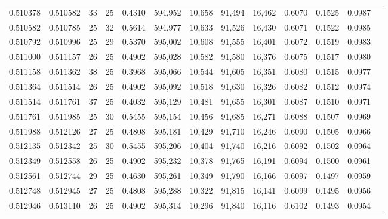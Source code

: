 \begin{tabular}{rrrrrrrrrrrrr}
0.510378 & 0.510582 &    33 &  25 &                                     0.4310 & 594,952 &  10,658 &  91,494 &  16,462 & 0.6070 & 0.1525 & 0.0987 \\
0.510582 & 0.510785 &    25 &  32 &                                     0.5614 & 594,977 &  10,633 &  91,526 &  16,430 & 0.6071 & 0.1522 & 0.0985 \\
0.510792 & 0.510996 &    25 &  29 &                                     0.5370 & 595,002 &  10,608 &  91,555 &  16,401 & 0.6072 & 0.1519 & 0.0983 \\
0.511000 & 0.511157 &    26 &  25 &                                     0.4902 & 595,028 &  10,582 &  91,580 &  16,376 & 0.6075 & 0.1517 & 0.0980 \\
0.511158 & 0.511362 &    38 &  25 &                                     0.3968 & 595,066 &  10,544 &  91,605 &  16,351 & 0.6080 & 0.1515 & 0.0977 \\
0.511364 & 0.511514 &    26 &  25 &                                     0.4902 & 595,092 &  10,518 &  91,630 &  16,326 & 0.6082 & 0.1512 & 0.0974 \\
0.511514 & 0.511761 &    37 &  25 &                                     0.4032 & 595,129 &  10,481 &  91,655 &  16,301 & 0.6087 & 0.1510 & 0.0971 \\
0.511761 & 0.511985 &    25 &  30 &                                     0.5455 & 595,154 &  10,456 &  91,685 &  16,271 & 0.6088 & 0.1507 & 0.0969 \\
0.511988 & 0.512126 &    27 &  25 &                                     0.4808 & 595,181 &  10,429 &  91,710 &  16,246 & 0.6090 & 0.1505 & 0.0966 \\
0.512135 & 0.512342 &    25 &  30 &                                     0.5455 & 595,206 &  10,404 &  91,740 &  16,216 & 0.6092 & 0.1502 & 0.0964 \\
0.512349 & 0.512558 &    26 &  25 &                                     0.4902 & 595,232 &  10,378 &  91,765 &  16,191 & 0.6094 & 0.1500 & 0.0961 \\
0.512561 & 0.512744 &    29 &  25 &                                     0.4630 & 595,261 &  10,349 &  91,790 &  16,166 & 0.6097 & 0.1497 & 0.0959 \\
0.512748 & 0.512945 &    27 &  25 &                                     0.4808 & 595,288 &  10,322 &  91,815 &  16,141 & 0.6099 & 0.1495 & 0.0956 \\
0.512946 & 0.513110 &    26 &  25 &                                     0.4902 & 595,314 &  10,296 &  91,840 &  16,116 & 0.6102 & 0.1493 & 0.0954 \\

\end{tabular}
